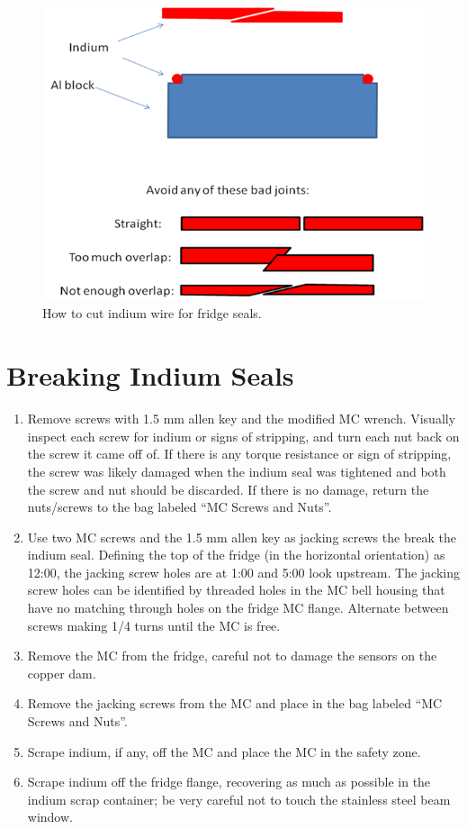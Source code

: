 \begin{figure}
 \centering
 \includegraphics[scale=0.5]{./img/indium-cut.png}
 \caption{How to cut indium wire for fridge seals. \cite{zhaoindium}}
 \label{fig:indium-cut}
\end{figure}



\section{Breaking Indium Seals}
\begin{enumerate}
 \item Remove screws with 1.5 mm allen key and the modified MC wrench.  Visually inspect each screw for indium or signs of stripping, and turn each nut back on the screw it came off of.  If there is any torque resistance or sign of stripping, the screw was likely damaged when the indium seal was tightened and both the screw and nut should be discarded.  If there is no damage, return the nuts/screws to the bag labeled ``MC Screws and Nuts''.
\item Use two MC screws and the 1.5 mm allen key as jacking screws the break the indium seal.  Defining the top of the fridge (in the horizontal orientation) as 12:00, the jacking screw holes are at 1:00 and 5:00 look upstream.  The jacking screw holes can be identified by threaded holes in the MC bell housing that have no matching through holes on the fridge MC flange.  Alternate between screws making 1/4 turns until the MC is free.
\item Remove the MC from the fridge, careful not to damage the sensors on the copper dam.
\item Remove the jacking screws from the MC and place in the bag labeled ``MC Screws and Nuts''.
\item Scrape indium, if any, off the MC and place the MC in the safety zone.
\item Scrape indium off the fridge flange, recovering as much as possible in the indium scrap container; be very careful not to touch the stainless steel beam window.
\end{enumerate}

